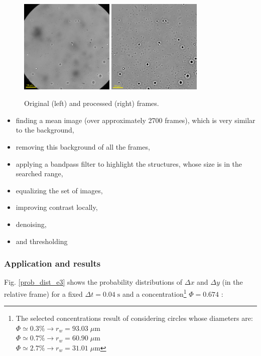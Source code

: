 \begin{figure}[H]
	\centering
	\includegraphics[width=0.4\textwidth]{archivos/frame_01_e3.png}
	\includegraphics[width=0.4\textwidth]{archivos/frame_01_e3_bp.png}
	\caption{Original (left) and processed (right) frames.}
	\label{orbpe3}
\end{figure}

\begin{itemize}
	\item finding a mean image (over approximately 2700 frames), which is very similar to the background,
	\item removing this background of all the frames,
	\item applying a bandpass filter to highlight the structures, whose size is in the searched range,
	\item equalizing the set of images,
	\item improving contrast locally,
	\item denoising,
	\item and thresholding
\end{itemize}

\subsubsection{Application and results}

Fig. \ref{prob_dist_e3} shows the probability distributions of $\Delta x$ and $\Delta y$ (in the relative frame) for a fixed $\Delta t = 0.04 \; \textrm{s}$ and a concentration\footnote{The selected concentrations result of considering circles whose diameters are: \\ 
	$ \Phi \simeq 0.3\% \rightarrow r_w = 93.03 \; \mu \textrm{m} $ \\
	$ \Phi \simeq 0.7\% \rightarrow r_w = 60.90 \; \mu \textrm{m} $ \\
	$ \Phi \simeq 2.7\% \rightarrow r_w = 31.01 \; \mu \textrm{m} $} 
$\Phi = 0.674$ :

